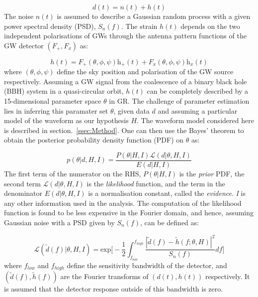 \documentclass[prd,preprintnumbers,twocolumn,eqsecnum,floatfix,a4paper,nofootinbib,superscriptaddress]{revtex4}
\begin{document}
\begin{equation}
d(t) = n(t) + h(t)
\label{eq:detector_strain}
\end{equation}
The noise $n(t)$ is assumed to describe a Gaussian random process with a given power spectral density (PSD), $S_n(f)$. The strain $h(t)$ depends on the two independent polarisations of GWs through the antenna pattern functions of the GW detector $(F_+, F_x)$ as:

\begin{equation}
h(t) = F_+(\theta, \phi, \psi)\mathrm{h}_+(t) + F_x(\theta, \phi, \psi)\mathrm{h}_x(t)
\end{equation}
where $(\theta, \phi, \psi)$ define the sky position and polarisation of the GW source respectively. Assuming a GW signal from the coalescence of a binary black hole (BBH) system in a quasi-circular orbit, $h(t)$ can be completely described by a 15-dimensional parameter space $\theta$ in GR. The challenge of parameter estimation lies in inferring this paramater set $\theta$, given data $d$ and assuming a particular model of the waveform as our hypothesis $H$. The waveform model considered here is described in section.~\ref{ssec:Method}. One can then use the Bayes' theorem to obtain the posterior probability density function (PDF) on $\theta$ as:

\begin{equation}
p(\theta|d, H, I) = \frac{P(\theta|H, I) \mathcal{L}(d|\theta, H, I)}{E(d|H, I)}
\label{eq:Bayes_theorem}
\end{equation} 
The first term of the numerator on the RHS, $P(\theta|H,I)$ is the \emph{prior} PDF, the second term $\mathcal{L}(d|\theta, H,I)$ is the \emph{likelihood} function, and the term in the denominator $E(d|\theta, H,I)$ is a normalisation constant, called the \emph{evidence}. \emph{I} is any other information used in the analysis. The computation of the likelihood function is found to be less expensive in the Fourier domain, and hence, assuming Gaussian noise with a PSD given by $S_n(f)$, can be defined as:

\begin{equation}
\mathcal{L}(\tilde{d}(f)|\theta, H,I) = \text{exp}\Big[ -\frac{1}{2}\int_{f_{low}}^{f_{high}} \frac{|\tilde{d}(f) - \tilde{h}(f;\theta, H)|^2}{S_n(f)}df\Big]
\end{equation}
where $f_{low}$ and $f_{high}$ define the sensitivity bandwidth of the detector, and $(\tilde{d}(f), \tilde{h}(f))$ are the Fourier transforms of $(d(t), h(t))$ respectively. It is assumed that the detector response outside of this bandwidth is zero. 
\end{document}
